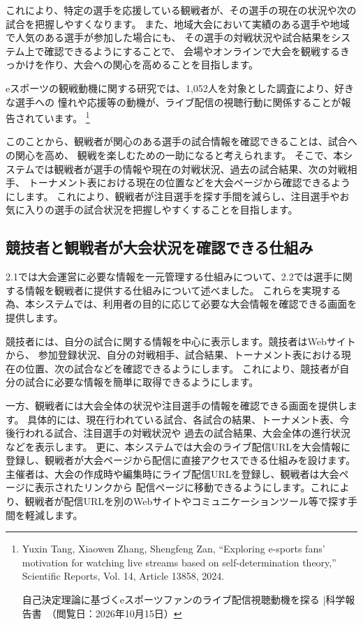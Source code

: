 これにより、特定の選手を応援している観戦者が、その選手の現在の状況や次の試合を把握しやすくなります。
また、地域大会において実績のある選手や地域で人気のある選手が参加した場合にも、
その選手の対戦状況や試合結果をシステム上で確認できるようにすることで、
会場やオンラインで大会を観戦するきっかけを作り、大会への関心を高めることを目指します。

eスポーツの観戦動機に関する研究では、1,052人を対象とした調査により、好きな選手への
憧れや応援等の動機が、ライブ配信の視聴行動に関係することが報告されています。\cite{scientificreports2024}
\footnote{Yuxin Tang, Xiaowen Zhang, Shengfeng Zan, “Exploring e-sports fans’ motivation for watching live streams based on self-determination theory,” Scientific Reports, Vol. 14, Article 13858, 2024. 

自己決定理論に基づくeスポーツファンのライブ配信視聴動機を探る |科学報告書　（閲覧日：2026年10月15日） }

このことから、観戦者が関心のある選手の試合情報を確認できることは、試合への関心を高め、
観戦を楽しむための一助になると考えられます。
そこで、本システムでは観戦者が選手の情報や現在の対戦状況、過去の試合結果、次の対戦相手、
トーナメント表における現在の位置などを大会ページから確認できるようにします。
これにより、観戦者が注目選手を探す手間を減らし、注目選手やお気に入りの選手の試合状況を把握しやすくすることを目指します。

\subsection{競技者と観戦者が大会状況を確認できる仕組み}

2.1では大会運営に必要な情報を一元管理する仕組みについて、2.2では選手に関する情報を観戦者に提供する仕組みについて述べました。
これらを実現する為、本システムでは、利用者の目的に応じて必要な大会情報を確認できる画面を提供します。

競技者には、自分の試合に関する情報を中心に表示します。競技者はWebサイトから、
参加登録状況、自分の対戦相手、試合結果、トーナメント表における現在の位置、次の試合などを確認できるようにします。
これにより、競技者が自分の試合に必要な情報を簡単に取得できるようにします。

一方、観戦者には大会全体の状況や注目選手の情報を確認できる画面を提供します。
具体的には、現在行われている試合、各試合の結果、トーナメント表、今後行われる試合、注目選手の対戦状況や
過去の試合結果、大会全体の進行状況などを表示します。
更に、本システムでは大会のライブ配信URLを大会情報に登録し、観戦者が大会ページから配信に直接アクセスできる仕組みを設けます。
主催者は、大会の作成時や編集時にライブ配信URLを登録し、観戦者は大会ページに表示されたリンクから
配信ページに移動できるようにします。これにより、観戦者が配信URLを別のWebサイトやコミュニケーションツール等で探す手間を軽減します。

